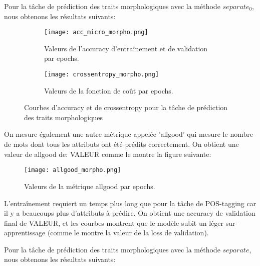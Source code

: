 \documentclass[a4paper]{article}
\begin{document}
Pour la tâche de prédiction des traits morphologiques avec la méthode $separate_0$, nous obtenons les résultats suivants: %

\begin{figure}[H]
    \centering
    \begin{subfigure}{0.45\textwidth}
        \centering
        \texttt{[image: acc\_micro\_morpho.png]}
        \caption{Valeurs de l'accuracy d'entraînement et de validation par epochs.}
    \end{subfigure}
    \hfill
    \begin{subfigure}{0.45\textwidth}
        \centering
        \texttt{[image: crossentropy\_morpho.png]}
        \caption{Valeurs de la fonction de coût par epochs.}
    \end{subfigure}
    \caption{Courbes d'accuracy et de crossentropy pour la tâche de prédiction des traits morphologiques}
\end{figure}

On mesure également une autre métrique appelée 'allgood' qui mesure le nombre de mots dont tous les attributs ont été prédits correctement. On obtient une valeur de allgood de: VALEUR comme le
montre la figure suivante:

\begin{figure}[H]
    \centering
    \texttt{[image: allgood\_morpho.png]}
    \caption{Valeurs de la métrique allgood par epochs.}
\end{figure}

L'entraînement requiert un temps plus long que pour la tâche de POS-tagging car il y a beaucoups plus d'attributs à prédire.
On obtient une accuracy de validation final de VALEUR, et les courbes montrent que le modèle subit un léger sur-apprentissage (comme le montre la valeur de la loss de validation).

Pour la tâche de prédiction des traits morphologiques avec la méthode $separate$, nous obtenons les résultats suivants: %
\end{document}
